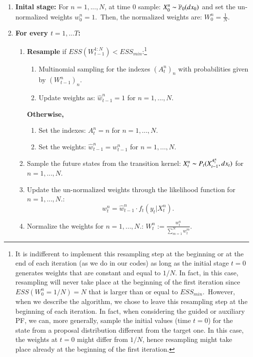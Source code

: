 \documentclass[
]{book}
\theoremstyle{break}
\theoremstyle{nonumberplain}
\begin{document}
\begin{enumerate}
    \item \textbf{Inital stage: }For $n=1,...,N$, at time 0 sample: $X_0^n\thicksim\mathbb P_0(dx_0)$ and set the un-normalized weights $w_0^n=1$.\
    Then, the normalized weights are: $W_0^n=\frac{1}{N}$.
    \item \textbf{For every $t=1,...T$:}
    \begin{enumerate}
        \item \textbf{Resample} if $ESS(W_{t-1}^{1:N})<ESS_{min}$:\footnote{It is indifferent to implement this resampling step at the beginning or at the end of each iteration (as we do in our codes) as long as the initial stage $t=0$ generates weights that are constant and equal to $1/N$. In fact, in this case, resampling will never take place at the beginning of the first iteration since $ESS(W_0^n=1/N)=N$ that is larger than or equal to $ESS_{min}$.\
        However, when we describe the algorithm, we chose to leave this resampling step at the beginning of each iteration. In fact, when considering the guided or auxiliary PF, we can, more generally, sample the initial values (time $t=0$) for the state from a proposal distribution different from the target one. In this case, the weights at $t=0$ might differ from $1/N$, hence resampling might take place already at the beginning of the first iteration.}
\begin{enumerate}
    \item Multinomial sampling for the indexes $(A_t^n)_n$ with probabilities given by $(W_{t-1}^n)_{n}$.
    \item Update weights as: $\hat w_{t-1}^n = 1$ for $n=1,...,N$.
\end{enumerate}
\textbf{Otherwise, } 
\begin{enumerate}
    \item Set the indexes: $A_t^{n}=n$ for $n=1,...,N$.
    \item Set the weights: $\hat w_{t-1}^n = w_{t-1}^n$ for $n=1,...,N$.
\end{enumerate}
\item Sample the future states from the transition kernel: $X_t^n\thicksim P_t(X_{t-1}^{A_t^n},dx_t)$  for $n=1,...,N$.
\item Update the un-normalized weights through the likelihood function for $n=1,...,N$.:
\begin{equation*}
    w_t^n=\hat w_{t-1}^n\cdot f_t(y_t|X_t^n).
\end{equation*}
\item Normalize the weights  for $n=1,...,N$.: $W_t^n:=\frac{w_t^n}{\sum_{m=1}^Nw_t^m}$.
    \end{enumerate}
\end{enumerate}
\end{document}
